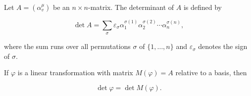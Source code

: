 Let $A = (\alpha_v^\mu)$ be an $n \times n$-matrix. The determinant of $A$ is defined by

$$\det A = \sum_{\sigma} \varepsilon_{\sigma} \alpha_1^{\sigma(1)} \alpha_2^{\sigma(2)} \cdots \alpha_n^{\sigma(n)},$$

where the sum runs over all permutations $\sigma$ of $\{1, \ldots, n\}$ and $\varepsilon_\sigma$ denotes the sign of $\sigma$.

If $\varphi$ is a linear transformation with matrix $M(\varphi) = A$ relative to a basis, then

$$\det \varphi = \det M(\varphi).$$
